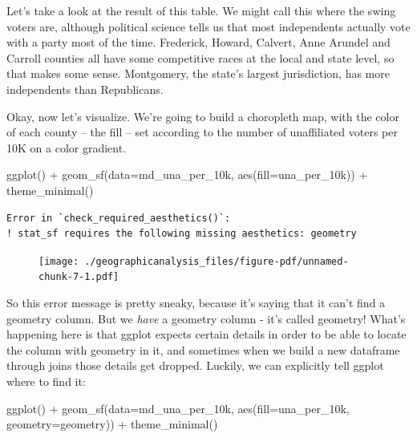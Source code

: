 \documentclass[
  letterpaper,
  DIV=11,
  numbers=noendperiod]{scrreprt}
\newenvironment{Shaded}{\begin{snugshade}}{\end{snugshade}}
\newcommand{\AttributeTok}[1]{\textcolor[rgb]{0.40,0.45,0.13}{#1}}
\newcommand{\FunctionTok}[1]{\textcolor[rgb]{0.28,0.35,0.67}{#1}}
\newcommand{\NormalTok}[1]{\textcolor[rgb]{0.00,0.23,0.31}{#1}}
\newcommand{\SpecialCharTok}[1]{\textcolor[rgb]{0.37,0.37,0.37}{#1}}
\begin{document}
Let's take a look at the result of this table. We might call this where
the swing voters are, although political science tells us that most
independents actually vote with a party most of the time. Frederick,
Howard, Calvert, Anne Arundel and Carroll counties all have some
competitive races at the local and state level, so that makes some
sense. Montgomery, the state's largest jurisdiction, has more
independents than Republicans.

Okay, now let's visualize. We're going to build a choropleth map, with
the color of each county -- the fill -- set according to the number of
unaffiliated voters per 10K on a color gradient.

\begin{Shaded}
\begin{Highlighting}[]
\FunctionTok{ggplot}\NormalTok{() }\SpecialCharTok{+}
  \FunctionTok{geom\_sf}\NormalTok{(}\AttributeTok{data=}\NormalTok{md\_una\_per\_10k, }\FunctionTok{aes}\NormalTok{(}\AttributeTok{fill=}\NormalTok{una\_per\_10k)) }\SpecialCharTok{+}
  \FunctionTok{theme\_minimal}\NormalTok{()}
\end{Highlighting}
\end{Shaded}

\begin{verbatim}
Error in `check_required_aesthetics()`:
! stat_sf requires the following missing aesthetics: geometry
\end{verbatim}

\begin{figure}[H]

{\centering \texttt{[image: ./geographicanalysis\_files/figure-pdf/unnamed-chunk-7-1.pdf]}

}

\end{figure}

So this error message is pretty sneaky, because it's saying that it
can't find a geometry column. But we \emph{have} a geometry column -
it's called geometry! What's happening here is that ggplot expects
certain details in order to be able to locate the column with geometry
in it, and sometimes when we build a new dataframe through joins those
details get dropped. Luckily, we can explicitly tell ggplot where to
find it:

\begin{Shaded}
\begin{Highlighting}[]
\FunctionTok{ggplot}\NormalTok{() }\SpecialCharTok{+}
  \FunctionTok{geom\_sf}\NormalTok{(}\AttributeTok{data=}\NormalTok{md\_una\_per\_10k, }\FunctionTok{aes}\NormalTok{(}\AttributeTok{fill=}\NormalTok{una\_per\_10k, }\AttributeTok{geometry=}\NormalTok{geometry)) }\SpecialCharTok{+}
  \FunctionTok{theme\_minimal}\NormalTok{()}
\end{Highlighting}
\end{Shaded}
\end{document}
